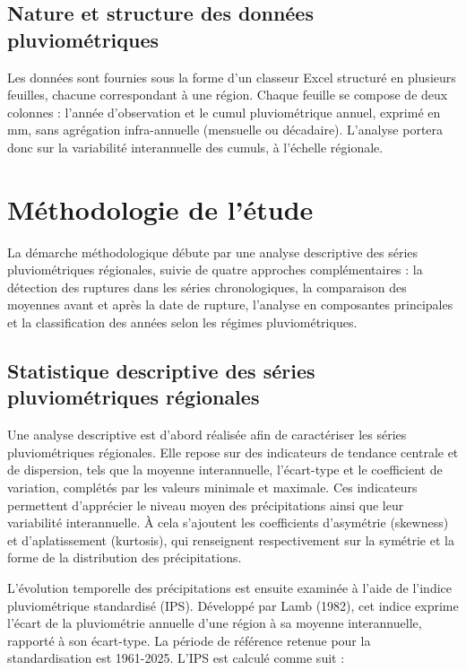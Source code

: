 \documentclass[12pt,a4paper]{report}
\begin{document}
\subsection{Nature et structure des données pluviométriques}

Les données sont fournies sous la forme d’un classeur Excel structuré en plusieurs feuilles, chacune correspondant à une région. Chaque feuille se compose de deux colonnes : l’année d’observation et le cumul pluviométrique annuel, exprimé en mm, sans agrégation infra-annuelle (mensuelle ou décadaire). L’analyse portera donc sur la variabilité interannuelle des cumuls, à l’échelle régionale.

\section{Méthodologie de l'étude}

La démarche méthodologique débute par une analyse descriptive des séries pluviométriques régionales, suivie de quatre approches complémentaires : la détection des ruptures dans les séries chronologiques, la comparaison des moyennes avant et après la date de rupture, l'analyse en composantes principales et la classification des années selon les régimes pluviométriques.

\subsection{Statistique descriptive des séries pluviométriques régionales}

Une analyse descriptive est d’abord réalisée afin de caractériser les séries pluviométriques régionales. Elle repose sur des indicateurs de tendance centrale et de dispersion, tels que la moyenne interannuelle, l’écart-type et le coefficient de variation, complétés par les valeurs minimale et maximale. Ces indicateurs permettent d’apprécier le niveau moyen des précipitations ainsi que leur variabilité interannuelle. À cela s’ajoutent les coefficients d’asymétrie (skewness) et d’aplatissement (kurtosis), qui renseignent respectivement sur la symétrie et la forme de la distribution des précipitations.

L’évolution temporelle des précipitations est ensuite examinée à l’aide de l’indice pluviométrique standardisé (IPS). Développé par Lamb (1982), cet indice exprime l’écart de la pluviométrie annuelle d’une région à sa moyenne interannuelle, rapporté à son écart-type. La période de référence retenue pour la standardisation est 1961-2025. L’IPS est calculé comme suit :
\end{document}
